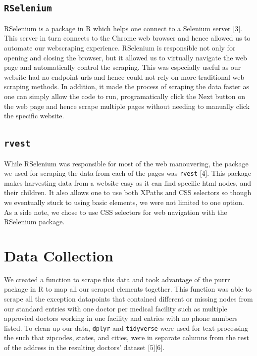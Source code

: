 \documentclass[10pt,letterpaper]{article}
\begin{document}
\subsection{\texorpdfstring{\texttt{RSelenium}}{RSelenium}}\label{rselenium}

RSelenium is a package in R which helps one connect to a Selenium server
{[}3{]}. This server in turn connects to the Chrome web browser and
hence allowed us to automate our webscraping experience. RSelenium is
responsible not only for opening and closing the browser, but it allowed
us to virtually navigate the web page and automatically control the
scraping. This was especially useful as our website had no endpoint urls
and hence could not rely on more traditional web scraping methods. In
addition, it made the process of scraping the data faster as one can
simply allow the code to run, programatically click the Next button on
the web page and hence scrape multiple pages without needing to manually
click the specific website.

\subsection{\texorpdfstring{\texttt{rvest}}{rvest}}\label{rvest}

While RSelenium was responsible for most of the web manouvering, the
package we used for scraping the data from each of the pages was
\texttt{rvest} {[}4{]}. This package makes harvesting data from a
website easy as it can find specific html nodes, and their children. It
also allows one to use both XPaths and CSS selectors so though we
eventually stuck to using basic elements, we were not limited to one
option. As a side note, we chose to use CSS selectors for web navigation
with the RSelenium package.

\section{Data Collection}\label{data-collection}

We created a function to scrape this data and took advantage of the
purrr package in R to map all our scraped elements together. This
function was able to scrape all the exception datapoints that contained
different or missing nodes from our standard entries with one doctor per
medical facility such as multiple approvied doctors working in one
facility and entries with no phone numbers listed. To clean up our data,
\texttt{dplyr} and \texttt{tidyverse} were used for text-processing the
such that zipcodes, states, and cities, were in separate columns from
the rest of the address in the resulting doctors' dataset
{[}5{]}{[}6{]}.
\end{document}
